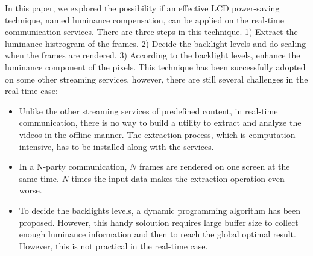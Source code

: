 In this paper, we explored the possibility if an effective LCD
power-saving technique, named luminance compensation, can be applied
on the real-time communication services. There are three steps in this
technique. 1) Extract the luminance histrogram of the frames. 2)
Decide the backlight levels and do scaling when the frames are
rendered. 3) According to the backlight levels, enhance the luminance
component of the pixels. This technique has been successfully adopted
on some other streaming services, however, there are still 
several challenges in the real-time case:
\begin{itemize}
  \item
    {
      Unlike the other streaming services of predefined content, in
      real-time communication, there is no way to build a utility to
      extract and analyze the videos in the offline manner. The extraction
      process, which is computation intensive, has to be installed
      along with the services. 
    }
  \item
    {
      In a N-party communication, $N$ frames are rendered on one screen
      at the same time. $N$ times the input data makes the extraction
      operation even worse.
    }
  \item
    {
      To decide the backlights levels, a dynamic programming algorithm
      has been proposed. However, this handy soloution requires large
      buffer size to collect enough luminance information and then to
      reach the global optimal result. However, this is not practical
      in the real-time case.
    }
\end{itemize}




